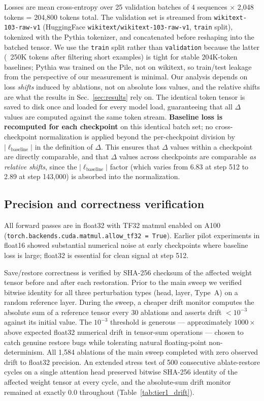 \documentclass{article}
\begin{document}
Losses are mean cross-entropy over 25 validation batches of 4 sequences $\times$ 2,048 tokens = 204,800 tokens total. The validation set is streamed from \texttt{wikitext-103-raw-v1} (HuggingFace \texttt{wikitext/wikitext-103-raw-v1}, \texttt{train} split), tokenized with the Pythia tokenizer, and concatenated before reshaping into the batched tensor. We use the \texttt{train} split rather than \texttt{validation} because the latter (~250K tokens after filtering short examples) is tight for stable 204K-token baselines; Pythia was trained on the Pile, not on wikitext, so train/test leakage from the perspective of our measurement is minimal. Our analysis depends on loss \emph{shifts} induced by ablations, not on absolute loss values, and the relative shifts are what the results in Sec.~\ref{sec:results} rely on. The identical token tensor is saved to disk once and loaded for every model load, guaranteeing that all $\Delta$ values are computed against the same token stream. \textbf{Baseline loss is recomputed for each checkpoint} on this identical batch set; no cross-checkpoint normalization is applied beyond the per-checkpoint division by $|\ell_\text{baseline}|$ in the definition of $\Delta$. This ensures that $\Delta$ values within a checkpoint are directly comparable, and that $\Delta$ values across checkpoints are comparable \emph{as relative shifts}, since the $|\ell_\text{baseline}|$ factor (which varies from 6.83 at step 512 to 2.89 at step 143,000) is absorbed into the normalization.

\subsection{Precision and correctness verification}

All forward passes are in float32 with TF32 matmul enabled on A100 (\texttt{torch.backends.cuda.matmul.allow\_tf32 = True}). Earlier pilot experiments in float16 showed substantial numerical noise at early checkpoints where baseline loss is large; float32 is essential for clean signal at step 512.

Save/restore correctness is verified by SHA-256 checksum of the affected weight tensor before and after each restoration. Prior to the main sweep we verified bitwise identity for all three perturbation types (head, layer, Type~A) on a random reference layer. During the sweep, a cheaper drift monitor computes the absolute sum of a reference tensor every 30 ablations and asserts drift $< 10^{-3}$ against its initial value. The $10^{-3}$ threshold is generous --- approximately $1000\times$ above expected float32 numerical drift in tensor-sum operations --- chosen to catch genuine restore bugs while tolerating natural floating-point non-determinism. All 1{,}584 ablations of the main sweep completed with zero observed drift to float32 precision. An extended stress test of 500 consecutive ablate-restore cycles on a single attention head preserved bitwise SHA-256 identity of the affected weight tensor at every cycle, and the absolute-sum drift monitor remained at exactly $0.0$ throughout (Table~\ref{tab:tier1_drift}).
\end{document}
